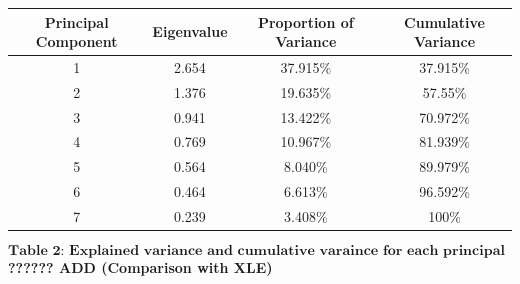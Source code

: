 \documentclass[12pt,twoside]{article}
\newcommand{\head}[1]{\textnormal{\textbf{#1}}}
\begin{document}
\bigbreak
\begin{tabular}{cccc}
\hline
\head{Principal Component} & \head{Eigenvalue} & \head{Proportion of Variance} & \head{Cumulative Variance}\\
\hline
1 & 2.654 &  37.915\% & 37.915\%\\
2 & 1.376 & 19.635\% & 57.55\%\\
3 & 0.941 &  13.422\% & 70.972\%\\
4 & 0.769 &  10.967\% & 81.939\%\\
5 & 0.564 &  8.040\%  & 89.979\%\\
6 & 0.464 & 6.613\% & 96.592\%\\
7 & 0.239 &  3.408\% & 100\%\\
\hline
\end{tabular}
$$\textbf{Table 2:  Explained variance and cumulative varaince for each principal component}$$
\bigbreak
\textbf{??????
ADD (Comparison with XLE)}
\bigbreak
\end{document}
